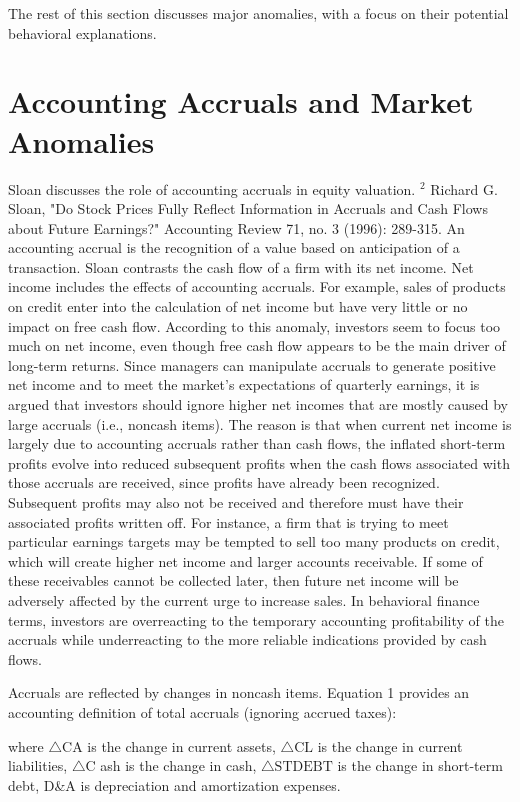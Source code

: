 \documentclass[11pt]{article}
\begin{document}
The rest of this section discusses major anomalies, with a focus on their potential behavioral explanations.

\section*{Accounting Accruals and Market Anomalies}
Sloan discusses the role of accounting accruals in equity valuation. ${ }^{2}$ Richard G. Sloan, "Do Stock Prices Fully Reflect Information in Accruals and Cash Flows about Future Earnings?" Accounting Review 71, no. 3 (1996): 289-315. An accounting accrual is the recognition of a value based on anticipation of a transaction. Sloan contrasts the cash flow of a firm with its net income. Net income includes the effects of accounting accruals. For example, sales of products on credit enter into the calculation of net income but have very little or no impact on free cash flow. According to this anomaly, investors seem to focus too much on net income, even though free cash flow appears to be the main driver of long-term returns. Since managers can manipulate accruals to generate positive net income and to meet the market's expectations of quarterly earnings, it is argued that investors should ignore higher net incomes that are mostly caused by large accruals (i.e., noncash items). The reason is that when current net income is largely due to accounting accruals rather than cash flows, the inflated short-term profits evolve into reduced subsequent profits when the cash flows associated with those accruals are received, since profits have already been recognized. Subsequent profits may also not be received and therefore must have their associated profits written off. For instance, a firm that is trying to meet particular earnings targets may be tempted to sell too many products on credit, which will create higher net income and larger accounts receivable. If some of these receivables cannot be collected later, then future net income will be adversely affected by the current urge to increase sales. In behavioral finance terms, investors are overreacting to the temporary accounting profitability of the accruals while underreacting to the more reliable indications provided by cash flows.

Accruals are reflected by changes in noncash items. Equation 1 provides an accounting definition of total accruals (ignoring accrued taxes):

where $\triangle \mathrm{CA}$ is the change in current assets, $\triangle \mathrm{CL}$ is the change in current liabilities, $\triangle \mathrm{C}$ ash is the change in cash, $\triangle \mathrm{STDEBT}$ is the change in short-term debt, D\&A is depreciation and amortization expenses.
\end{document}
